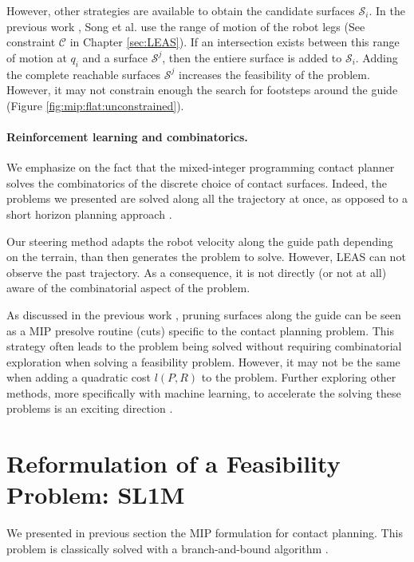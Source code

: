 However, other strategies are available to obtain the candidate surfaces $\mathcal{S}_i$.
In the previous work \cite{sl1m_v2}, Song et al. use the range of motion of the robot legs (See constraint $\mathcal{C}$ in Chapter \ref{sec:LEAS}).
If an intersection exists between this range of motion at $q_i$ and a surface $\mathcal{S}^j$, then the entiere surface is added to $\mathcal{S}_i$.
Adding the complete reachable surfaces $\mathcal{S}^j$ increases the feasibility of the problem. 
However, it may not constrain enough the search for footsteps around the guide (Figure \ref{fig:mip:flat:unconstrained}).


\paragraph{Reinforcement learning and combinatorics.}

We emphasize on the fact that the mixed-integer programming contact planner solves the combinatorics of the discrete choice of contact surfaces.
Indeed, the problems we presented are solved along all the trajectory at once, as opposed to a short horizon planning approach \cite{fanny_mip_solo}.

Our steering method adapts the robot velocity along the guide path depending on the terrain, than then generates the problem to solve. 
However, LEAS can not observe the past trajectory. 
As a consequence, it is not directly (or not at all) aware of the combinatorial aspect of the problem. 

As discussed in the previous work \cite{sl1m_v2}, pruning surfaces along the guide can be seen as a MIP presolve routine (cuts) specific to the contact planning problem.
This strategy often leads to the problem being solved without requiring combinatorial exploration when solving a feasibility problem. 
However, it may not be the same when adding a quadratic cost $l(P,R)$ to the problem. 
Further exploring other methods, more specifically with machine learning, to accelerate the solving these problems is an exciting direction \cite{mip_rl_branch, mip_rl_cut, deepmind_RL_MIP}.




\section{Reformulation of a Feasibility Problem: SL1M\label{sub:mip:sl1m}}
We presented in previous section the MIP formulation for contact planning.
This problem is classically solved with a branch-and-bound algorithm \cite{gurobi_mip}.

